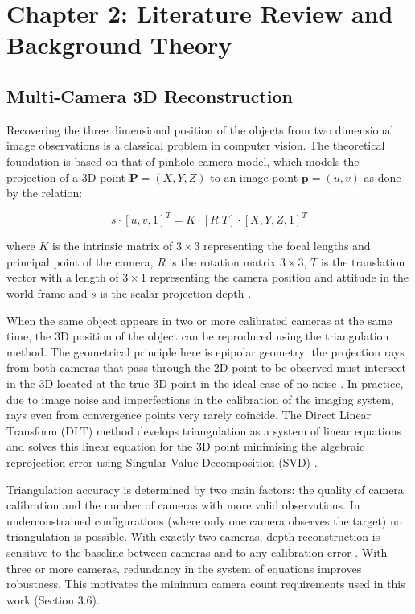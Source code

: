 \chapter{Chapter 2: Literature Review and Background Theory}

\section{Multi-Camera 3D Reconstruction}

Recovering the three dimensional position of the objects from two dimensional image observations is a classical problem in computer vision. The theoretical foundation is based on that of pinhole camera model, which models the projection of a 3D point $\mathbf{P} = (X, Y, Z)$ to an image point $\mathbf{p} = (u, v)$ as done by the relation:

\begin{equation}
s \cdot [u, v, 1]^T = K \cdot [R | T] \cdot [X, Y, Z, 1]^T \label{eq:2_1}
\end{equation}

where $K$ is the intrinsic matrix of $3 \times 3$ representing the focal lengths and principal point of the camera, $R$ is the rotation matrix $3 \times 3$, $T$ is the translation vector with a length of $3 \times 1$ representing the camera position and attitude in the world frame and $s$ is the scalar projection depth \cite{ref1}.

When the same object appears in two or more calibrated cameras at the same time, the 3D position of the object can be reproduced using the triangulation method. The geometrical principle here is epipolar geometry: the projection rays from both cameras that pass through the 2D point to be observed must intersect in the 3D located at the true 3D point in the ideal case of no noise \cite{ref2}. In practice, due to image noise and imperfections in the calibration of the imaging system, rays even from convergence points very rarely coincide. The Direct Linear Transform (DLT) method develops triangulation as a system of linear equations and solves this linear equation for the 3D point minimising the algebraic reprojection error using Singular Value Decomposition (SVD) \cite{ref1}.

Triangulation accuracy is determined by two main factors: the quality of camera calibration and the number of cameras with more valid observations. In underconstrained configurations (where only one camera observes the target) no triangulation is possible. With exactly two cameras, depth reconstruction is sensitive to the baseline between cameras and to any calibration error \cite{ref4}. With three or more cameras, redundancy in the system of equations improves robustness. This motivates the minimum camera count requirements used in this work (Section 3.6).

